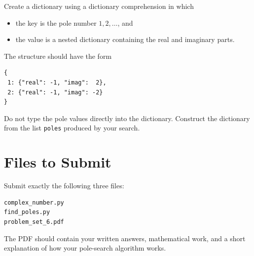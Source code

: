 \documentclass{article}
\begin{document}
Create a dictionary using a dictionary comprehension in which

\begin{itemize}
\item the key is the pole number \(1,2,\ldots\), and
\item the value is a nested dictionary containing the real and
imaginary parts.
\end{itemize}

The structure should have the form

\begin{verbatim}
{
 1: {"real": -1, "imag":  2},
 2: {"real": -1, "imag": -2}
}
\end{verbatim}

Do not type the pole values directly into the dictionary.
Construct the dictionary from the list \texttt{poles} produced
by your search.

\section*{Files to Submit}

Submit exactly the following three files:

\begin{verbatim}
complex_number.py
find_poles.py
problem_set_6.pdf
\end{verbatim}

The PDF should contain your written answers, mathematical work,
and a short explanation of how your pole-search algorithm works.
\end{document}
